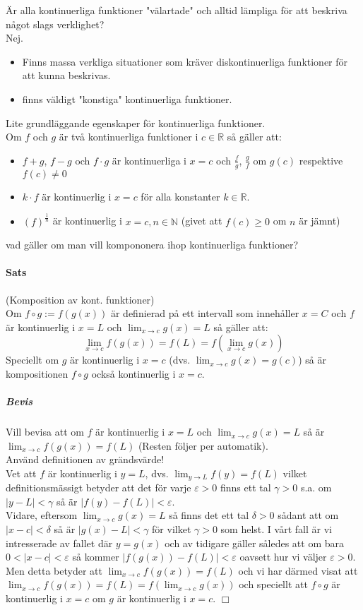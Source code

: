 Är alla kontinuerliga funktioner "välartade" och alltid lämpliga för att beskriva något slags verklighet?\\
Nej.
\begin{itemize}
    \item Finns massa verkliga situationer som kräver diskontinuerliga funktioner för att kunna beskrivas.
    \item finns väldigt "konstiga" kontinuerliga funktioner.
\end{itemize}
Lite grundläggande egenskaper för kontinuerliga funktioner.\\
Om $f$ och $g$ är två kontinuerliga funktioner i $c\in\mathbb{R}$ så gäller att:\\
\begin{itemize}
    \item $f+g$, $f-g$ och $f\cdot g$ är kontinuerliga i $x=c$ och $\frac{f}{g}$, $\frac{g}{f}$ om $g(c)$ respektive $f(c)\neq 0$
    \item $k\cdot f$ är kontinuerlig i $x=c$ för alla konstanter $k\in\mathbb{R}$.
    \item $(f)^\frac{1}{n}$ är kontinuerlig i $x=c,n\in\mathbb{N}$ (givet att $f(c)\geq 0$ om $n$ är jämnt)
\end{itemize}
vad gäller om man vill kompononera ihop kontinuerliga funktioner?
\paragraph{Sats} (Komposition av kont. funktioner)\\
Om $f\circ g := f(g(x))$ är definierad på ett intervall som innehåller
$x=C$ och $f$ är kontinuerlig i $x=L$ och $\lim_{x\to c}g(x)=L$
så gäller att:
\begin{equation*}
    \lim_{x\to c}f(g(x))=f(L)=f(\lim_{x\to c}g(x))
\end{equation*}
Speciellt om $g$ är kontinuerlig i $x=c$ (dvs. $\lim_{x\to c}g(x)=g(c)$)
så är kompositionen $f\circ g$ också kontinuerlig i $x=c$.

\subparagraph{Bevis} Vill bevisa att om $f$ är kontinuerlig i $x=L$ och
$\lim_{x\to c}g(x)=L$ så är $\lim_{x\to c} f(g(x))=f(L)$ (Resten följer per automatik).\\
Använd definitionen av grändsvärde!\\
Vet att $f$ är kontinuerlig i $y=L$, dvs. $\lim_{y\to L}f(y)=f(L)$
vilket definitionsmässigt betyder att det för varje $\varepsilon > 0$
finns ett tal $\gamma > 0$ s.a. om $|y-L|<\gamma$ så är $|f(y)-f(L)|<\varepsilon$.\\
Vidare, eftersom $\lim_{x\to c}g(x)=L$ så finns det ett tal $\delta > 0$
sådant att om $|x-c|<\delta$ så är $|g(x)-L|<\gamma$ för vilket $\gamma>0$ som helst.
I vårt fall är vi intresserade av fallet där $y=g(x)$ och av tidigare
gäller således att om bara $0< |x-c| <\varepsilon$ så kommer
$|f(g(x))-f(L)|<\varepsilon$ oavsett hur vi väljer $\varepsilon>0$.\\
Men detta betyder att $\lim_{x\to c}f(g(x))=f(L)$ och vi har därmed visat att
$\lim_{x\to c}f(g(x))=f(L)=f(\lim_{x\to c}g(x))$ och speciellt att
$f\circ g$ är kontinuerlig i $x=c$ om $g$ är kontinuerlig i $x=c$. $\Box$

